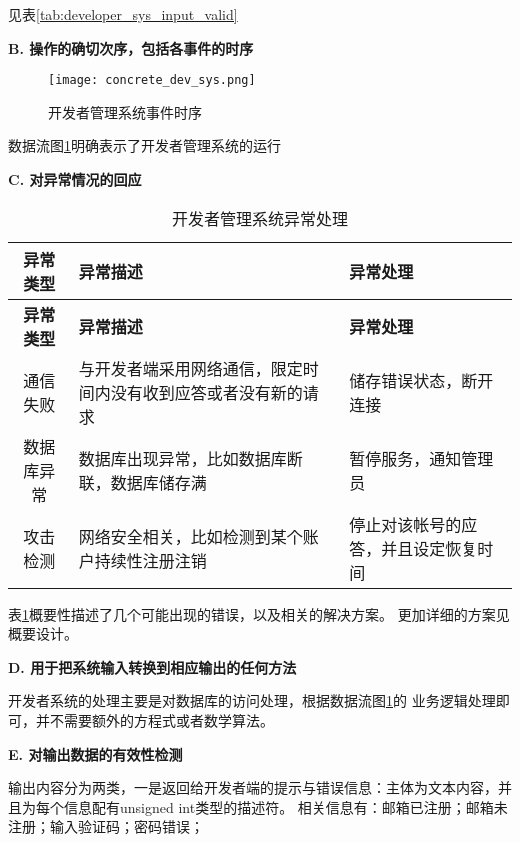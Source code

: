 见表\ref{tab:developer_sys_input_valid}

\textbf{B. 操作的确切次序，包括各事件的时序}

\begin{figure}[ht]
	\centering
	\texttt{[image: concrete\_dev\_sys.png]}
	\caption{开发者管理系统事件时序} \label{fig:concrete_developer}
\end{figure}


数据流图\ref{fig:concrete_developer}明确表示了开发者管理系统的运行


\textbf{C. 对异常情况的回应}

\begin{longtable}{|c|p{6cm}|p{6cm}|}
\caption{开发者管理系统异常处理}\label{tab:developer_exception} \\
\hline
\textbf{异常类型} & \textbf{异常描述} & \textbf{异常处理}\\
\hline
\endfirsthead
\hline
\textbf{异常类型} & \textbf{异常描述} & \textbf{异常处理}\\
\hline
\endhead
\hline 
\endfoot
\hline
\endlastfoot
通信失败 & 
与开发者端采用网络通信，限定时间内没有收到应答或者没有新的请求 &
储存错误状态，断开连接\\
数据库异常 & 数据库出现异常，比如数据库断联，数据库储存满 &
暂停服务，通知管理员\\
攻击检测 & 网络安全相关，比如检测到某个账户持续性注册注销 &
停止对该帐号的应答，并且设定恢复时间\\
\end{longtable}

表\ref{tab:developer_exception}概要性描述了几个可能出现的错误，以及相关的解决方案。
更加详细的方案见概要设计。



\textbf{D. 用于把系统输入转换到相应输出的任何方法}

开发者系统的处理主要是对数据库的访问处理，根据数据流图\ref{fig:concrete_developer}的
业务逻辑处理即可，并不需要额外的方程式或者数学算法。
		
\textbf{E. 对输出数据的有效性检测}

输出内容分为两类，一是返回给开发者端的提示与错误信息：主体为文本内容，并且为每个信息配有unsigned int类型的描述符。
相关信息有：邮箱已注册；邮箱未注册；输入验证码；密码错误；

